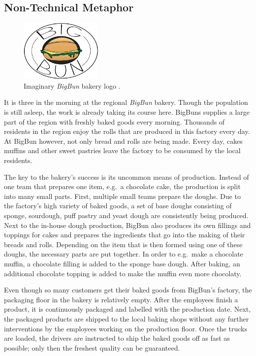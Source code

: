 
\subsection{Non-Technical Metaphor}%
\begin{figure}
  \begin{center}
    \includegraphics[width=4cm]{images/figures/big_bun_logo.png}
  \end{center}
  \caption{Imaginary \textit{BigBun} bakery logo
  \autocite{WiesemannImaginaryBigBunbakery2019}.}%
  \label{fig:big_bun_logo}
\end{figure}
It is three in the morning at the regional \textit{BigBun} bakery. Though the
population is still asleep, the work is already taking its course here.
BigBuns supplies a large part of the region with freshly baked goods every
morning. Thousands of residents in the region enjoy the rolls that are produced
in this factory every day. At BigBun however, not only bread and rolls are
being made. Every day, cakes muffins and other sweet pastries leave the factory
to be consumed by the local residents.

The key to the bakery's success is its uncommon means of production. Instead of
one team that prepares one item, e.g.\ a chocolate cake, the production is
split into many small parts. First, multiple small teams prepare the doughs.
Due to the factory's high variety of baked goods, a set of base doughs
consisting of sponge, sourdough, puff pastry and yeast dough are consistently
being produced. Next to the in-house dough production, BigBun also produces its
own fillings and toppings for cakes and prepares the ingredients that go into
the making of their breads and rolls. Depending on the item that is then formed
using one of these doughs, the necessary parts are put together. In order to
e.g.\ make a chocolate muffin, a chocolate filling is added to the sponge base
dough. After baking, an additional chocolate topping is added to make the
muffin even more chocolaty.

Even though so many customers get their baked goods from BigBun's factory, the
packaging floor in the bakery is relatively empty. After the employees finish a
product, it is continuously packaged and labelled with the production date.
Next, the packaged products are shipped to the local baking shops without any
further interventions by the employees working on the production floor. Once
the trucks are loaded, the drivers are instructed to ship the baked goods off
as fast as possible; only then the freshest quality can be guaranteed.

